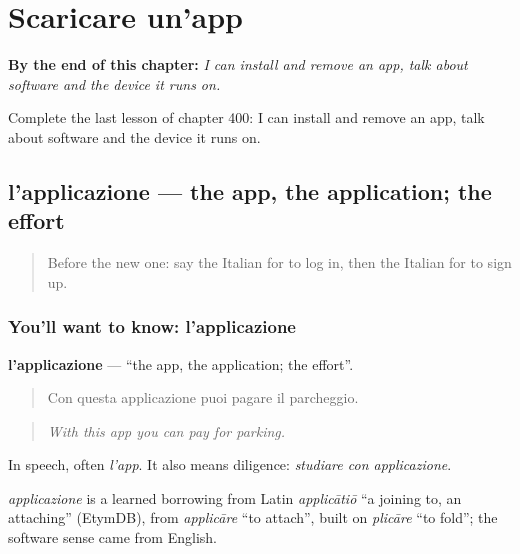 
\chapter{Scaricare un'app}
\label{ch:it-scaricare-un-app}

\begin{chapteropening}
\textbf{By the end of this chapter:} \emph{I can install and remove an app, talk about software and the device it runs on.}

Complete the last lesson of chapter 400: I can install and remove an app, talk about software and the device it runs on.
\end{chapteropening}

\section[l'applicazione]{l'applicazione — the app, the application; the effort}

\label{lesson:IT-C400-applicazione}



\begin{quote}
Before the new one: say the Italian for to log in, then the Italian for to sign up.
\end{quote}

\subsection*{You'll want to know: l'applicazione}
\textbf{l'applicazione} — \textquotedblleft{}the app, the application; the effort\textquotedblright{}.

\begin{quote}
Con questa applicazione puoi pagare il parcheggio.
\end{quote}

\begin{quote}
\emph{With this app you can pay for parking.}
\end{quote}

In speech, often \emph{l'app}. It also means diligence: \emph{studiare con applicazione}.

\begin{cousinweb}
\emph{applicazione} is a learned borrowing from Latin \emph{applicātiō} \textquotedblleft{}a joining to, an attaching\textquotedblright{} (EtymDB), from \emph{applicāre} \textquotedblleft{}to attach\textquotedblright{}, built on \emph{plicāre} \textquotedblleft{}to fold\textquotedblright{}; the software sense came from English.
\end{cousinweb}

